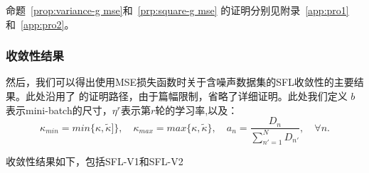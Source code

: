 \noindent 命题~\ref{prop:variance-g mse}和~\ref{prp:square-g mse} 的证明分别见附录~\ref{app:pro1}和~\ref{app:pro2}。

\subsubsection{收敛性结果}\label{proofC}



然后，我们可以得出使用MSE损失函数时关于含噪声数据集的SFL收敛性的主要结果。此处沿用了 \cite{b8} 的证明路径，由于篇幅限制，省略了详细证明。此处我们定义 $b$ 表示mini-batch的尺寸，$\eta^r$表示第$r$轮的学习率,以及：
$$
\kappa_{min}= min\{\kappa,\tilde{\kappa}]\}, \quad\kappa_{max}= max\{\kappa,\tilde{\kappa}\}, \quad a_n= \frac{D_n}{\sum_{n'=1}^{N}D_{n'}}, \quad \forall n.
$$

\noindent 收敛性结果如下，包括SFL-V1和SFL-V2

